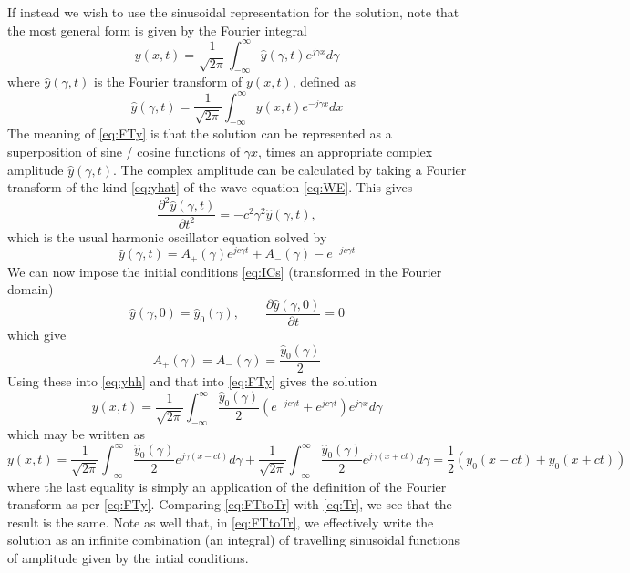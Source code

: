 \documentclass[11pt,twoside,a4paper,english]{book}
\begin{document}
If instead we wish to use the sinusoidal representation for the solution, note that the most general form is given by the Fourier integral
\begin{equation}\label{eq:FTy}
y(x,t) = \frac{1}{\sqrt{2\pi}} \int_{-\infty}^{\infty} \hat y(\gamma,t) e^{j\gamma x}d\gamma
\end{equation}
where $\hat y(\gamma,t)$ is the Fourier transform of $y(x,t)$, defined as
\begin{equation}\label{eq:yhat}
\hat y(\gamma,t) = \frac{1}{\sqrt{2\pi}} \int_{-\infty}^{\infty}  y(x,t) e^{-j\gamma x}d x
\end{equation}
The meaning of \eqref{eq:FTy} is that the solution can be represented as a superposition of sine / cosine functions of $\gamma x$, times an appropriate complex amplitude $\hat y(\gamma,t)$. The complex amplitude can be calculated by taking a Fourier transform of the kind \eqref{eq:yhat} of the wave equation \eqref{eq:WE}. This gives
\begin{equation}
\frac{\partial^2 \hat y(\gamma,t)}{\partial t^2} = - c^2\gamma^2 \hat y(\gamma,t),
\end{equation}
which is the usual harmonic oscillator equation solved by
\begin{equation}\label{eq:yhh}
\hat y(\gamma,t) = A_+(\gamma) e^{jc\gamma t} + A_-(\gamma)-e^{-jc\gamma t} 
\end{equation}
We can now impose the initial conditions \eqref{eq:ICs} (transformed in the Fourier domain)
\begin{equation}
\hat y(\gamma,0) = \hat y_0(\gamma), \qquad \frac{\partial \hat y (\gamma,0)}{\partial t} = 0
\end{equation}
which give
\begin{equation}
A_+(\gamma) = A_-(\gamma) = \frac{\hat y_0(\gamma)}{2}
\end{equation}
Using these into \eqref{eq:yhh} and that into \eqref{eq:FTy} gives the solution 
\begin{equation}
y(x,t) = \frac{1}{\sqrt{2\pi}} \int_{-\infty}^{\infty}\frac{\hat y_0(\gamma)}{2} \left( e^{-j c\gamma t} + e^{j c\gamma t} \right) e^{j\gamma x} d\gamma 
\end{equation}
which may be written as
\begin{equation}\label{eq:FTtoTr}
y(x,t) = \frac{1}{\sqrt{2\pi}} \int_{-\infty}^{\infty}\frac{\hat y_0(\gamma)}{2}  e^{j\gamma (x - c  t)}d\gamma +  \frac{1}{\sqrt{2\pi}} \int_{-\infty}^{\infty}\frac{\hat y_0(\gamma)}{2}  e^{j\gamma (x + c  t)}d\gamma  = \frac{1}{2}\left( y_0(x-ct) + y_0(x+ct)\right)
\end{equation}
where the last equality is simply an application of the definition of the Fourier transform as per \eqref{eq:FTy}. Comparing \eqref{eq:FTtoTr} with \eqref{eq:Tr}, we see that the result is the same. Note as well that, in \eqref{eq:FTtoTr}, we effectively write the solution as an infinite combination (an integral) of travelling sinusoidal functions of amplitude given by the intial conditions.
\end{document}
